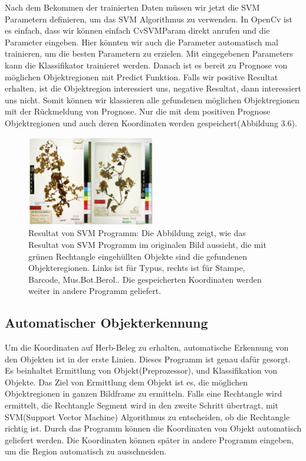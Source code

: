 \documentclass[10pt,a4paper]{report}
\begin{document}
Nach dem Bekommen der trainierten Daten müssen wir jetzt die SVM Parametern definieren, um das SVM Algorithmus zu verwenden. In OpenCv ist es einfach, dass wir können einfach CvSVMParam direkt anrufen und die Parameter eingeben. Hier könnten wir auch die Parameter automatisch mal trainieren, um die besten Parametern zu erzielen. 
Mit eingegebenen Parameters kann die Klassifikator trainieret werden. Danach ist es bereit zu Prognose von möglichen Objektregionen mit Predict Funktion. Falls wir positive Resultat erhalten, ist die Objektregion interessiert uns, negative Resultat, dann interessiert uns nicht. Somit können wir klassieren alle gefundenen möglichen Objektregionen mit der Rückmeldung von Prognose. Nur die mit dem positiven Prognose Objektregionen und auch deren Koordinaten werden gespeichert(Abbildung 3.6). \\
\begin{figure}[htbp] 
	\centering
	\includegraphics[width=0.5\textwidth]{Svmresult.png}
	\caption{Resultat von SVM Programm: Die Abbildung zeigt, wie das Resultat von SVM Programm im originalen Bild aussieht, die mit grünen Rechtangle eingehüllten Objekte sind die gefundenen Objekteregionen. Links ist für Typus, rechts ist für Stampe, Barcode, Mus.Bot.Berol.. Die gespeicherten Koordinaten werden weiter in andere Programm geliefert.
	}
	\label{fig:Bild 4}
\end{figure}

\subsection{Automatischer Objekterkennung}
Um die Koordinaten auf Herb-Beleg zu erhalten, automatische Erkennung von den Objekten ist in der erste Linien.  Dieses Programm ist genau dafür gesorgt. Es beinhaltet Ermittlung von Objekt(Preprozessor), und Klassifikation von Objekte.  Das Ziel von Ermittlung dem Objekt ist es, die möglichen Objektregionen in ganzen Bildframe zu ermitteln. Falls eine Rechtangle wird ermittelt, die Rechtangle Segment wird in den zweite Schritt übertragt, mit SVM(Support Vector Machine) Algorithmus zu entscheiden, ob die Rechtangle richtig ist. Durch das Programm können die Koordinaten von Objekt automatisch geliefert werden. Die Koordinaten können später in andere Programm eingeben, um die Region automatisch zu ausschneiden. 
\end{document}
